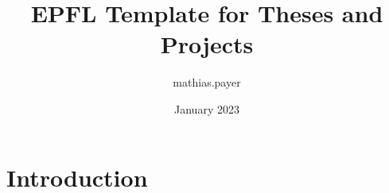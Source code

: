 \documentclass{article}
\title{EPFL Template for Theses and Projects}
\author{mathias.payer }
\date{January 2023}
\begin{document}
\maketitle

\section{Introduction}
\end{document}
